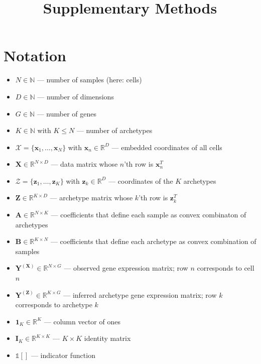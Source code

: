 \documentclass{article}
\title{Supplementary Methods}
\author{}
\date{}
\begin{document}
\maketitle

\tableofcontents
\clearpage

\setcounter{page}{13}
\section{Notation}\label{sec:notation}

\begin{itemize}
    \item $N \in \mathbb{N}$ — number of samples (here: cells)
    \item $D \in \mathbb{N}$ — number of dimensions
    \item $G \in \mathbb{N}$ — number of genes
    \item $K \in \mathbb{N}$ with $K \leq N$ — number of archetypes

    \item $\mathcal{X} = \{\mathbf{x}_1, \ldots, \mathbf{x}_N\}$ with $\mathbf{x}_n \in \mathbb{R}^D$ — embedded coordinates of all cells
    \item $\mathbf{X} \in \mathbb{R}^{N \times D}$ — data matrix whose $n$'th row is $\mathbf{x}_n^T$

    \item $\mathcal{Z} = \{\mathbf{z}_1, \ldots, \mathbf{z}_K\}$ with $\mathbf{z}_k \in \mathbb{R}^D$ — coordinates of the $K$ archetypes
    \item $\mathbf{Z} \in \mathbb{R}^{K \times D}$ — archetype matrix whose $k$'th row is $\mathbf{z}_k^T$

    \item $\mathbf{A} \in \mathbb{R}^{N \times K}$ — coefficients that define each sample as convex combinaton of archetypes
    \item $\mathbf{B} \in \mathbb{R}^{K \times N}$ — coefficients that define each archetype as convex combination of samples

    \item $\mathbf{Y}^{(\mathbf{X})} \in \mathbb{R}^{N \times G}$ — observed gene expression matrix; row $n$ corresponds to cell $n$
    \item $\mathbf{Y}^{(\mathbf{Z})} \in \mathbb{R}^{K \times G}$ — inferred archetype gene expression matrix; row $k$ corresponds to archetype $k$

    \item $\mathbf{1}_K \in \mathbb{R}^K$ — column vector of ones
    \item $\mathbf{I}_K \in \mathbb{R}^{K \times K}$ — $K \times K$ identity matrix
    \item $\mathds{1}[]$ — indicator function
\end{itemize}
\end{document}
